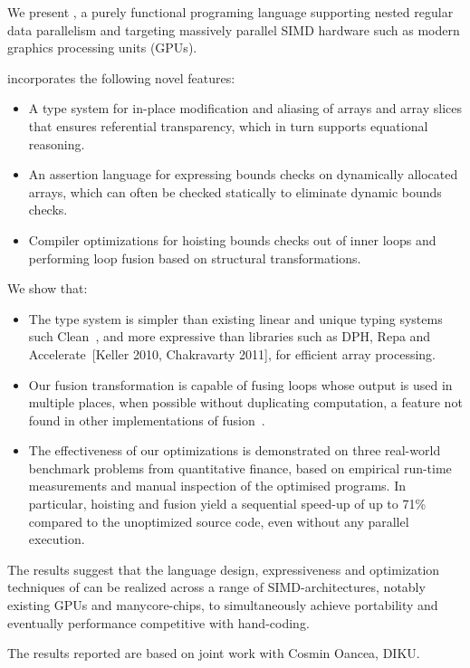 We present \LO{}, a purely functional programing language supporting nested
regular data parallelism and targeting massively parallel SIMD hardware
such as modern graphics processing units (GPUs).

\LO{} incorporates the following novel features:

\begin{itemize}
\item A type system for in-place modification and aliasing of arrays
  and array slices that ensures referential transparency, which in
  turn supports equational reasoning.

\item An assertion language for expressing bounds checks on
  dynamically allocated arrays, which can often be checked statically
  to eliminate dynamic bounds checks.

\item Compiler optimizations for hoisting bounds checks out of inner
  loops and performing loop fusion based on structural
  transformations.
\end{itemize}

We show that:

\begin{itemize}
\item The type system is simpler than existing linear and unique
  typing systems such Clean~\cite{barendsen1996uniqueness}, and more
  expressive than libraries such as DPH, Repa and
  Accelerate~\cite{Chak06DPH,keller2010regular,ArrayAccelerate}[Keller
  2010, Chakravarty 2011], for efficient array processing.

\item Our fusion transformation is capable of fusing loops whose
  output is used in multiple places, when possible without duplicating
  computation, a feature not found in other implementations of
  fusion~\cite{jones2001playing}.

\item The effectiveness of our optimizations is demonstrated on three
  real-world benchmark problems from quantitative finance, based on
  empirical run-time measurements and manual inspection of the
  optimised programs.  In particular, hoisting and fusion yield a
  sequential speed-up of up to 71\% compared to the unoptimized source
  code, even without any parallel execution.
\end{itemize}

The results suggest that the language design, expressiveness and
optimization techniques of \LO{} can be realized across a range of
SIMD-architectures, notably existing GPUs and manycore-chips, to
simultaneously achieve portability and eventually performance
competitive with hand-coding.

The results reported are based on joint work with Cosmin Oancea, DIKU.

